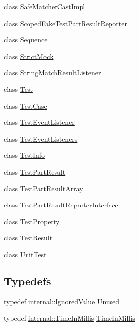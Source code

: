 \begin{DoxyCompactItemize}
\item 
class \hyperlink{classtesting_1_1SafeMatcherCastImpl}{Safe\+Matcher\+Cast\+Impl}
\item 
class \hyperlink{classtesting_1_1ScopedFakeTestPartResultReporter}{Scoped\+Fake\+Test\+Part\+Result\+Reporter}
\item 
class \hyperlink{classtesting_1_1Sequence}{Sequence}
\item 
class \hyperlink{classtesting_1_1StrictMock}{Strict\+Mock}
\item 
class \hyperlink{classtesting_1_1StringMatchResultListener}{String\+Match\+Result\+Listener}
\item 
class \hyperlink{classtesting_1_1Test}{Test}
\item 
class \hyperlink{classtesting_1_1TestCase}{Test\+Case}
\item 
class \hyperlink{classtesting_1_1TestEventListener}{Test\+Event\+Listener}
\item 
class \hyperlink{classtesting_1_1TestEventListeners}{Test\+Event\+Listeners}
\item 
class \hyperlink{classtesting_1_1TestInfo}{Test\+Info}
\item 
class \hyperlink{classtesting_1_1TestPartResult}{Test\+Part\+Result}
\item 
class \hyperlink{classtesting_1_1TestPartResultArray}{Test\+Part\+Result\+Array}
\item 
class \hyperlink{classtesting_1_1TestPartResultReporterInterface}{Test\+Part\+Result\+Reporter\+Interface}
\item 
class \hyperlink{classtesting_1_1TestProperty}{Test\+Property}
\item 
class \hyperlink{classtesting_1_1TestResult}{Test\+Result}
\item 
class \hyperlink{classtesting_1_1UnitTest}{Unit\+Test}
\end{DoxyCompactItemize}
\subsection*{Typedefs}
\begin{DoxyCompactItemize}
\item 
typedef \hyperlink{classtesting_1_1internal_1_1IgnoredValue}{internal\+::\+Ignored\+Value} \hyperlink{namespacetesting_a603e329ec0263ebfcf16f712810bd511}{Unused}
\item 
typedef \hyperlink{namespacetesting_1_1internal_a66a845df404b38fe85c5e14a069f255a}{internal\+::\+Time\+In\+Millis} \hyperlink{namespacetesting_a992de1d091ce660f451d1e8b3ce30fd6}{Time\+In\+Millis}
\end{DoxyCompactItemize}
